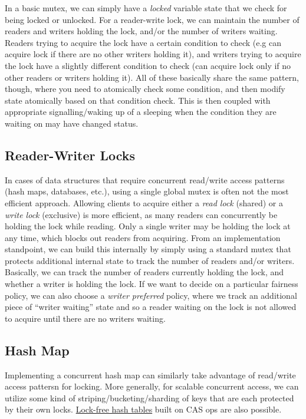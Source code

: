 \documentclass[10pt,a4paper]{article}
\begin{document}
In a basic mutex, we can simply have a \textit{locked} variable state that we check for being locked or unlocked. For a reader-write lock, we can maintain the number of readers and writers holding the lock, and/or the number of writers waiting. Readers trying to acquire the lock have a certain condition to check (e.g can acquire lock if there are no other writers holding it), and writers trying to acquire the lock have a slightly different condition to check (can acquire lock only if no other readers or writers holding it). All of these basically share the same pattern, though, where you need to atomically check some condition, and then modify state atomically based on that condition check. This is then coupled with appropriate signalling/waking up of a sleeping when the condition they are waiting on may have changed status.

\subsection{Reader-Writer Locks}

In cases of data structures that require concurrent read/write access patterns (hash maps, databases, etc.), using a single global mutex is often not the most efficient approach. Allowing clients to acquire either a \textit{read lock} (shared) or a \textit{write lock} (exclusive) is more efficient, as many readers can concurrently be holding the lock while reading. Only a single writer may be holding the lock at any time, which blocks out readers from acquiring. From an implementation standpoint, we can build this internally by simply using a standard mutex that protects additional internal state to track the number of readers and/or writers. Basically, we can track the number of readers currently holding the lock, and whether a writer is holding the lock. If we want to decide on a particular fairness policy, we can also choose a \textit{writer preferred} policy, where we track an additional piece of ``writer waiting'' state and so a reader waiting on the lock is not allowed to acquire until there are no writers waiting.

\subsection{Hash Map}

Implementing a concurrent hash map can similarly take advantage of read/write access pattersn for locking. More generally, for scalable concurrent access, we can utilize some kind of striping/bucketing/sharding of keys that are each protected by their own locks. \href{https://preshing.com/20130605/the-worlds-simplest-lock-free-hash-table/}{Lock-free hash tables} built on CAS ops are also possible. 





\end{document}
